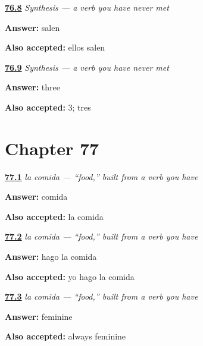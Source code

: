 \noindent\begin{minipage}[t]{\linewidth}
\raggedright
\hyperlink{review-ES-C13-sintesis-derivar-they}{\textbf{76.8}} \emph{Synthesis — a verb you have never met}\par
\small \textbf{Answer:} salen\par
\footnotesize \textbf{Also accepted:} ellos salen
\end{minipage}\par\medskip

\noindent\begin{minipage}[t]{\linewidth}
\raggedright
\hyperlink{review-ES-C13-sintesis-derivar-rules}{\textbf{76.9}} \emph{Synthesis — a verb you have never met}\par
\small \textbf{Answer:} three\par
\footnotesize \textbf{Also accepted:} 3; tres
\end{minipage}\par\medskip

\section*{Chapter 77}

\noindent\begin{minipage}[t]{\linewidth}
\raggedright
\hyperlink{review-ES-C43-comida-build}{\textbf{77.1}} \emph{la comida — \textquotedblleft{}food,\textquotedblright{} built from a verb you have}\par
\small \textbf{Answer:} comida\par
\footnotesize \textbf{Also accepted:} la comida
\end{minipage}\par\medskip

\noindent\begin{minipage}[t]{\linewidth}
\raggedright
\hyperlink{review-ES-C43-comida-make}{\textbf{77.2}} \emph{la comida — \textquotedblleft{}food,\textquotedblright{} built from a verb you have}\par
\small \textbf{Answer:} hago la comida\par
\footnotesize \textbf{Also accepted:} yo hago la comida
\end{minipage}\par\medskip

\noindent\begin{minipage}[t]{\linewidth}
\raggedright
\hyperlink{review-ES-C43-comida-gender}{\textbf{77.3}} \emph{la comida — \textquotedblleft{}food,\textquotedblright{} built from a verb you have}\par
\small \textbf{Answer:} feminine\par
\footnotesize \textbf{Also accepted:} always feminine
\end{minipage}\par\medskip

